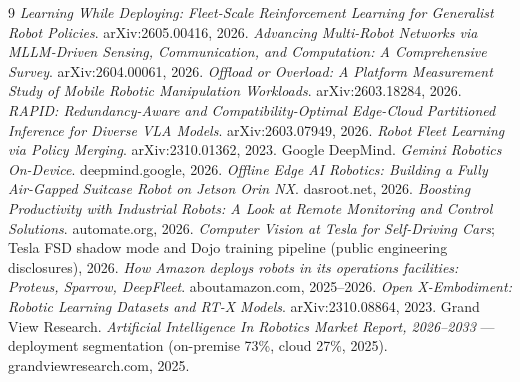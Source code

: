 \documentclass[11pt]{article}
\begin{document}
\begin{thebibliography}{9}
 \emph{Learning While Deploying: Fleet-Scale Reinforcement
  Learning for Generalist Robot Policies}. arXiv:2605.00416, 2026.
 \emph{Advancing Multi-Robot Networks via MLLM-Driven Sensing,
  Communication, and Computation: A Comprehensive Survey}. arXiv:2604.00061, 2026.
 \emph{Offload or Overload: A Platform Measurement Study
  of Mobile Robotic Manipulation Workloads}. arXiv:2603.18284, 2026.
 \emph{RAPID: Redundancy-Aware and Compatibility-Optimal
  Edge-Cloud Partitioned Inference for Diverse VLA Models}. arXiv:2603.07949, 2026.
 \emph{Robot Fleet Learning via Policy Merging}.
  arXiv:2310.01362, 2023.
 Google DeepMind. \emph{Gemini Robotics On-Device}.
  deepmind.google, 2026.
 \emph{Offline Edge AI Robotics: Building a Fully
  Air-Gapped Suitcase Robot on Jetson Orin NX}. dasroot.net, 2026.
 \emph{Boosting Productivity with Industrial Robots: A
  Look at Remote Monitoring and Control Solutions}. automate.org, 2026.
 \emph{Computer Vision at Tesla for Self-Driving Cars};
  Tesla FSD shadow mode and Dojo training pipeline (public engineering
  disclosures), 2026.
 \emph{How Amazon deploys robots in its operations
  facilities: Proteus, Sparrow, DeepFleet}. aboutamazon.com, 2025--2026.
 \emph{Open X-Embodiment: Robotic Learning Datasets
  and RT-X Models}. arXiv:2310.08864, 2023.
 Grand View Research. \emph{Artificial Intelligence In
  Robotics Market Report, 2026--2033} — deployment segmentation (on-premise 73\%,
  cloud 27\%, 2025). grandviewresearch.com, 2025.
\end{thebibliography}
\end{document}
